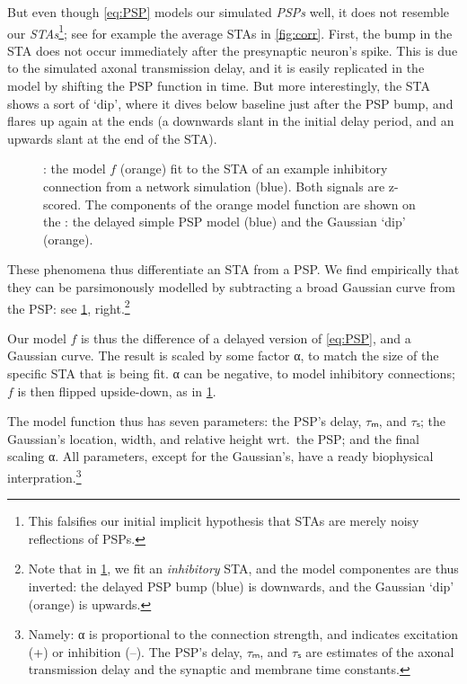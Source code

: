 But even though \cref{eq:PSP} models our simulated \emph{PSPs} well, it does not resemble our \emph{STAs}\footnote{
    This falsifies our initial implicit hypothesis that STAs are merely noisy reflections of PSPs.
};
see for example the average STAs in \cref{fig:corr}.
First, the bump in the STA does not occur immediately after the presynaptic neuron's spike. This is due to the simulated axonal transmission delay, and it is easily replicated in the model by shifting the PSP function in time. But more interestingly, the STA shows a sort of `dip', where it dives below baseline just after the PSP bump, and flares up again at the ends (a downwards slant in the initial delay period, and an upwards slant at the end of the STA).

\begin{figure}
    {\Left: the model $f$ (orange) fit to the STA of an example inhibitory connection from a network simulation (blue). Both signals are z-scored.
    The components of the orange model function are shown on the
    \Right: the delayed simple PSP model (blue) and  the Gaussian `dip' (orange).}
    \label{fig:modelfit}
\end{figure}

These phenomena thus differentiate an STA from a PSP. We find empirically that they can be parsimonously modelled by subtracting a broad Gaussian curve from the PSP: see \cref{fig:modelfit}, right.\footnote{
    Note that in \cref{fig:modelfit}, we fit an \emph{inhibitory} STA, and the model componentes are thus inverted: the delayed PSP bump (blue) is downwards, and the Gaussian `dip' (orange) is upwards.
}

Our model $f$ is thus the difference of a delayed version of \cref{eq:PSP}, and a  Gaussian curve. The result is scaled by some factor α, to match the size of the specific STA that is being fit. α can be negative, to model inhibitory connections; $f$ is then flipped upside-down, as in \cref{fig:modelfit}.

The model function thus has seven parameters: the PSP's delay, $τₘ$, and $τₛ$; the Gaussian's location, width, and relative height wrt.~the PSP; and the final scaling α.
All parameters, except for the Gaussian's, have a ready biophysical interpration.\footnote
    {Namely: α is proportional to the connection strength, and indicates excitation (+) or inhibition (–). The PSP's delay, $τₘ$, and $τₛ$ are estimates of the axonal transmission delay and the synaptic and membrane time constants.}

